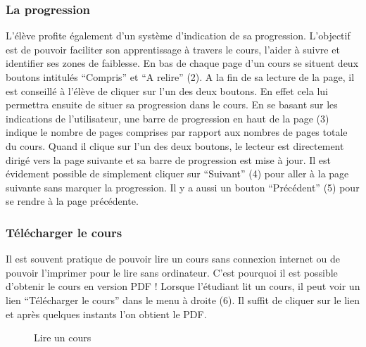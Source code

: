 \documentclass[letterpaper,10pt,oneside]{sphinxmanual}
\begin{document}
\subsubsection{La progression}
\label{functionalities:la-progression}
L'élève profite également d'un système d'indication de sa progression. L'objectif est de pouvoir faciliter son apprentissage à travers le cours, l'aider à suivre et identifier ses zones de faiblesse. En bas de chaque page d'un cours se situent deux boutons intitulés ``Compris'' et ``A relire'' (2). A la fin de sa lecture de la page, il est conseillé à l'élève de cliquer sur l'un des deux boutons. En effet cela lui permettra ensuite de situer sa progression dans le cours. En se basant sur les indications de l'utilisateur, une barre de progression en haut de la page (3) indique le nombre de pages comprises par rapport aux nombres de pages totale du cours. Quand il clique sur l'un des deux boutons, le lecteur est directement dirigé vers la page suivante et sa barre de progression est mise à jour. Il est évidement possible de simplement cliquer sur ``Suivant'' (4) pour aller à la page suivante sans marquer la progression. Il y a aussi un bouton ``Précédent'' (5) pour se rendre à la page précédente.


\subsubsection{Télécharger le cours}
\label{functionalities:telecharger-le-cours}
Il est souvent pratique de pouvoir lire un cours sans connexion internet ou de pouvoir l'imprimer pour le lire sans ordinateur. C'est pourquoi il est possible d'obtenir le cours en version PDF ! Lorsque l'étudiant lit un cours, il peut voir un lien ``Télécharger le cours'' dans le menu à droite (6). Il suffit de cliquer sur le lien et après quelques instants l'on obtient le PDF.
\begin{figure}[htbp]
\centering
\capstart

\caption{Lire un cours}\end{figure}
\end{document}
